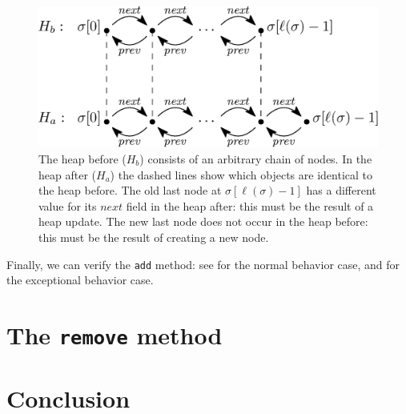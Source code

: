 \documentclass[runningheads]{llncs}
\begin{document}
\begin{figure}
   \centering
   \includegraphics[scale=0.4]{figures/linkedlist-linklast.eps}
   \caption{The heap before ($H_b$) consists of an arbitrary chain of nodes. In the heap after ($H_a$) the dashed lines show which objects are identical to the heap before. The old last node at $\sigma[\ell(\sigma)-1]$ has a different value for its $\mathit{next}$ field in the heap after: this must be the result of a heap update. The new last node does not occur in the heap before: this must be the result of creating a new node.}
   \label{fig:linklast}
\end{figure}

Finally, we can verify the \texttt{add} method: see \cite[6:58--8:08]{Bian2019addbranch} for the normal behavior case, and \cite[8:09--]{Bian2019addbranch} for the exceptional behavior case.

\section{The \texttt{remove} method}\label{sec:remove}




\section{Conclusion}\label{sec:conclusion}



\end{document}
